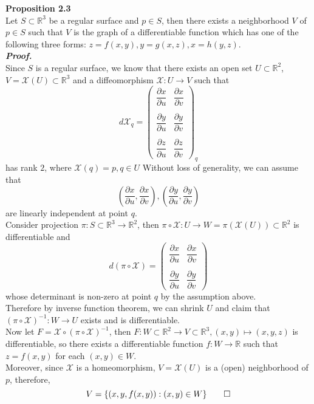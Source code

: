 \documentclass{article}
\begin{document}
\par
\textbf{Proposition 2.3}\\
Let $S \subset \mathbb{R}^3$ be a regular surface and $p \in S$, then there exists a neighborhood $V$ of $p \in S$
such that $V$ is the graph of a differentiable function which has one of the following three forms:
$z=f(x,y), y=g(x,z), x=h(y,z)$.\\
\textbf{\textit{Proof.}}\\
Since $S$ is a regular surface, we know that there exists an open set $U \subset \mathbb{R}^2$, $V=\mathcal{X}(U) \subset \mathbb{R}^3$
and a diffeomorphism $\mathcal{X}: U \to V$ such that
$$
    d\mathcal{X}_q = 
    \left(
    \begin{array}{cc}
        \dfrac{\partial x}{\partial u} & \dfrac{\partial x}{\partial v}\\\\
        \dfrac{\partial y}{\partial u} & \dfrac{\partial y}{\partial v}\\\\
        \dfrac{\partial z}{\partial u} & \dfrac{\partial z}{\partial v}
    \end{array}
    \right)_q
$$
has rank $2$, where $\mathcal{X}(q)=p, q \in U$
Without loss of generality, we can assume that
$$
    (\frac{\partial x}{\partial u}, \frac{\partial x}{\partial v}), (\frac{\partial y}{\partial u}, \frac{\partial y}{\partial v})
$$
are linearly independent at point $q$.\\
Consider projection $\pi: S \subset \mathbb{R}^3 \to \mathbb{R}^2$, then $\pi \circ \mathcal{X}: U \to W=\pi(\mathcal{X}(U)) \subset \mathbb{R}^2$ is differentiable and
$$
    d(\pi \circ \mathcal{X}) = 
    \left(
    \begin{array}{cc}
        \dfrac{\partial x}{\partial u} & \dfrac{\partial x}{\partial v}\\\\
        \dfrac{\partial y}{\partial u} & \dfrac{\partial y}{\partial v}
    \end{array}
    \right)
$$
whose determinant is non-zero at point $q$ by the assumption above.\\
Therefore by inverse function theorem, we can shrink $U$ and claim that $(\pi \circ \mathcal{X})^{-1}: W \to U$ exists and
is differentiable.\\
Now let $F = \mathcal{X} \circ (\pi \circ \mathcal{X})^{-1}$, then $F: W \subset \mathbb{R}^2 \to V \subset \mathbb{R}^3, (x,y) \mapsto (x,y,z)$ is
differentiable, so there exists a differentiable function $f: W \to \mathbb{R}$ such that $z=f(x,y)$ for each $(x,y) \in W$.\\
Moreover, since $\mathcal{X}$ is a homeomorphism, $V=\mathcal{X}(U)$ is a (open) neighborhood of $p$, therefore,
$$
    V = \{(x,y,f(x,y)): (x,y) \in W\} \qed
$$
\end{document}
